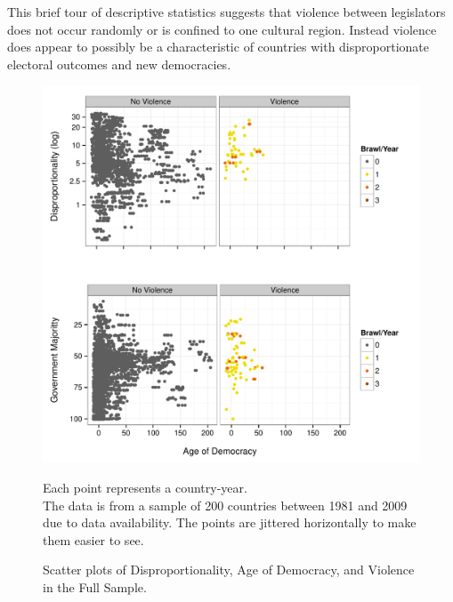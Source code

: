 \documentclass[a4paper]{article}\usepackage[]{graphicx}\usepackage[]{color}
\newenvironment{knitrout}{}{} %
\begin{document}
This brief tour of descriptive statistics suggests that violence between legislators does not occur randomly or is confined to one cultural region. Instead violence does appear to possibly be a characteristic of countries with disproportionate electoral outcomes and new democracies.

\begin{figure}[t]
    \caption{Scatter plots of Disproportionality, Age of Democracy, and Violence in the Full Sample.}  
    \label{framework_empirical}
    \begin{center}

\begin{knitrout}
\color{fgcolor}
\includegraphics[width=0.8\linewidth]{figure/FrameworkEmpirical} 

\end{knitrout}

    \end{center}
    \begin{singlespace}
        {\scriptsize{Each point represents a country-year. \\ The data is from a sample of 200 countries between 1981 and 2009 due to data availability. The points are jittered horizontally to make them easier to see.}}
    \end{singlespace}

\end{figure}
\end{document}
